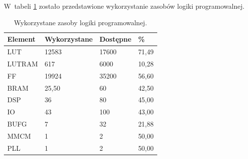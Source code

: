 W~tabeli \ref{tab:fpgautilization} zostało przedstawione wykorzystanie zasobów logiki programowalnej.
\begin{table}[]
\centering
\caption{Wykorzystane zasoby logiki programowalnej.}
\label{tab:fpgautilization}
\begin{tabular}{|l|l|l|l|}
\hline
Element & Wykorzystane & Dostępne & \% \\ \hline 
LUT & 12583 & 17600 & 71,49 \\ \hline
LUTRAM & 617 & 6000 & 10,28 \\ \hline
FF & 19924 & 35200 & 56,60 \\ \hline
BRAM & 25,50 & 60 & 42,50 \\ \hline
DSP & 36 & 80 & 45,00 \\ \hline
IO & 43 & 100 & 43,00 \\ \hline
BUFG & 7 & 32 & 21,88 \\ \hline
MMCM & 1 & 2 & 50,00 \\ \hline
PLL & 1 & 2 & 50,00 \\ \hline
\end{tabular}
\end{table}

